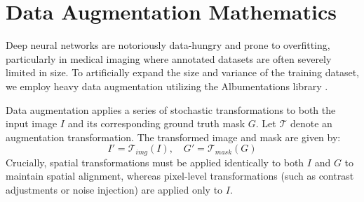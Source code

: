 \section{Data Augmentation Mathematics}
Deep neural networks are notoriously data-hungry and prone to overfitting, particularly in medical imaging where annotated datasets are often severely limited in size. To artificially expand the size and variance of the training dataset, we employ heavy data augmentation utilizing the Albumentations library \parencite{buslaev2020albumentations}.

Data augmentation applies a series of stochastic transformations to both the input image $I$ and its corresponding ground truth mask $G$. Let $\mathcal{T}$ denote an augmentation transformation. The transformed image and mask are given by:
\begin{equation}
    I' = \mathcal{T}_{img}(I), \quad G' = \mathcal{T}_{mask}(G)
\end{equation}
Crucially, spatial transformations must be applied identically to both $I$ and $G$ to maintain spatial alignment, whereas pixel-level transformations (such as contrast adjustments or noise injection) are applied only to $I$.


